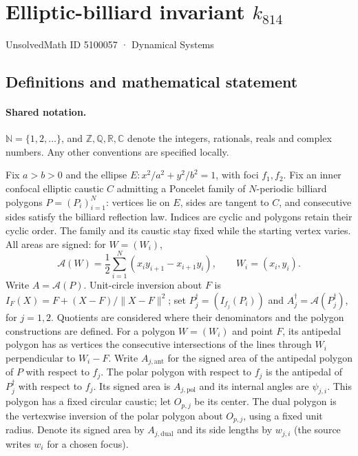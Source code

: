 \documentclass[11pt]{article}
\begin{document}
\setcounter{section}{5100056}
\section{Elliptic-billiard invariant $k_{814}$}\label{5100057}
{\small\sffamily UnsolvedMath ID 5100057 · Dynamical Systems}
\subsection{Definitions and mathematical statement}

\paragraph{Shared notation.}$\mathbb N=\{1,2,\ldots\}$, and $\mathbb Z,\mathbb Q,\mathbb R,\mathbb C$ denote the integers, rationals, reals and complex numbers. Any other conventions are specified locally.


Fix $a>b>0$ and the ellipse $E:x^2/a^2+y^2/b^2=1$, with foci $f_1,f_2$. Fix an inner confocal elliptic caustic $C$ admitting a Poncelet family of $N$-periodic billiard polygons $P=(P_i)_{i=1}^N$: vertices lie on $E$, sides are tangent to $C$, and consecutive sides satisfy the billiard reflection law. Indices are cyclic and polygons retain their cyclic order. The family and its caustic stay fixed while the starting vertex varies. All areas are signed: for $W=(W_i)$,
\[\mathcal A(W)=\frac12\sum_{i=1}^N(x_i y_{i+1}-x_{i+1}y_i),\qquad W_i=(x_i,y_i).\]
Write $A=\mathcal A(P)$. Unit-circle inversion about $F$ is $I_F(X)=F+(X-F)/\lVert X-F\rVert^2$; set $P_j^\dagger=(I_{f_j}(P_i))$ and $A_j^\dagger=\mathcal A(P_j^\dagger)$, for $j=1,2$. Quotients are considered where their denominators and the polygon constructions are defined. For a polygon $W=(W_i)$ and point $F$, its antipedal polygon has as vertices the consecutive intersections of the lines through $W_i$ perpendicular to $W_i-F$. Write $A_{j,\mathrm{ant}}$ for the signed area of the antipedal polygon of $P$ with respect to $f_j$. The polar polygon with respect to $f_j$ is the antipedal of $P_j^\dagger$ with respect to $f_j$. Its signed area is $A_{j,\mathrm{pol}}$ and its internal angles are $\psi_{j,i}$. This polygon has a fixed circular caustic; let $O_{p,j}$ be its center. The dual polygon is the vertexwise inversion of the polar polygon about $O_{p,j}$, using a fixed unit radius. Denote its signed area by $A_{j,\mathrm{dual}}$ and its side lengths by $w_{j,i}$ (the source writes $w_i$ for a chosen focus).
\end{document}
